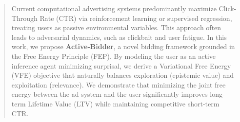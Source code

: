 \begin{abstract}
Current computational advertising systems predominantly maximize Click-Through Rate (CTR) via reinforcement learning or supervised regression, treating users as passive environmental variables. This approach often leads to adversarial dynamics, such as clickbait and user fatigue. In this work, we propose \textbf{Active-Bidder}, a novel bidding framework grounded in the Free Energy Principle (FEP). By modeling the user as an active inference agent minimizing surprisal, we derive a Variational Free Energy (VFE) objective that naturally balances exploration (epistemic value) and exploitation (relevance). We demonstrate that minimizing the joint free energy between the ad system and the user significantly improves long-term Lifetime Value (LTV) while maintaining competitive short-term CTR.
\end{abstract}

